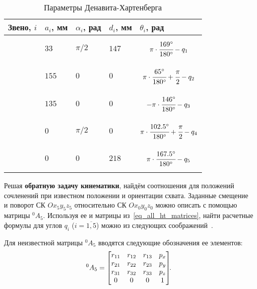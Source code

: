 \begin{table}[h!]
	\caption{Параметры Денавита-Хартенберга}
	\begin{center}
		\begin{tabularx}{1\textwidth}{|>{\textwidth}Y|>{\textwidth}Y|>{\textwidth}Y|>{\textwidth}Y|Y|}
			\hline
			Звено, $i$ 	& $a_i$, мм & $\alpha_i$, рад & $d_i$, мм & $\theta_i$, рад\\
			  		& $33$ & $\pi/2$ & $147$ & \parbox[c][0.7\height]{4cm}{$$\pi \cdot \cfrac{169^\circ}{180^\circ} - q_1$$}\\
			 		& $155$ & $0$ 	& $0$ & \parbox[c][0.7\height]{4cm}{$$\pi \cdot \cfrac{65^\circ}{180^\circ} + \cfrac{\pi}{2} - q_2$$}\\
			 		& $135$ & $0$ 	& $0$ 	& \parbox[c][0.7\height]{4cm}{$$-\pi \cdot \cfrac{146^\circ}{180^\circ} - q_3$$}\\
			 	& $0$ & $\pi/2$ & $0$ & \parbox[c][0.7\height]{4cm}{$$\pi \cdot \cfrac{102.5^\circ}{180^\circ} + \cfrac{\pi}{2} - q_4$$}\\
			 		& $0$ & $0$ 	& $218$     & \parbox[c][0.7\height]{4cm}{$$\pi \cdot \cfrac{167.5^\circ}{180^\circ} - q_5$$}\\
			\hline
		\end{tabularx}
	\end{center}
	\label{table_DH_params}
\end{table}

Решая \textbf{обратную задачу кинематики}\label{part_kinematics_inverse}, найдём соотношения для положений сочленений при известном положении и ориентации схвата. Заданные смещение и поворот СК $Ox_5y_5z_5$ относительно СК $Ox_0y_0z_0$ можно описать с помощью матрицы ${}^0A_5$.
Используя ее и матрицы из~\eqref{eq_all_ht_matrices}, найти расчетные формулы для углов $q_i$ ($i=\overline{1,5}$) можно из следующих соображений~\cite{craig2018introduction}.

Для неизвестной матрицы ${}^0A_5$ вводятся следующие обозначения ее элементов:
\begin{equation}\label{ik}
	{}^0A_5 =
	\left[\begin{matrix}
	r_{11} & r_{12} & r_{13} & p_{x}\\
	r_{21} & r_{22} & r_{23} & p_{y}\\
	r_{31} & r_{32} & r_{33} & p_{z}\\
	0 & 0 & 0 & 1
	\end{matrix}\right]\!\!\ldotp
\end{equation}

